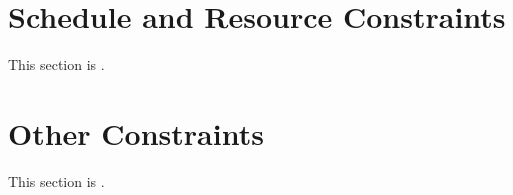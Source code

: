 \section{Schedule and Resource Constraints}
\label{loc:RWO_ScheduleAndResourceConstraints}
% 

This section is \TBD.


\section{Other Constraints}
\label{loc:RWO_OtherConstraints}
% 

This section is \TBD.